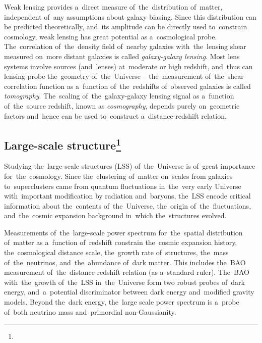 Weak lensing provides a~direct measure of~the~distribution of~matter, independent of~any assumptions about galaxy biasing. Since this distribution can be predicted theoretically, and~its amplitude can be directly used to~constrain cosmology, weak lensing has great potential as a~cosmological probe. The~correlation of~the~density field of~nearby galaxies with~the~lensing shear measured on~more distant galaxies is called \textit{galaxy-galaxy lensing}. Most lens systems involve sources (and~lenses) at~moderate or high redshift, and~thus can lensing probe the~geometry of~the~Universe -- the~measurement of~the~shear correlation function as a~function of~the~redshifts of~observed galaxies is called \textit{tomography}. The~scaling of~the~galaxy-galaxy lensing signal as a~function of~the~source redshift, known as \textit{cosmography}, depends purely on~geometric factors and~hence can be used to~construct a~distance-redshift relation.
\DIFdelbegin %
\DIFdelend \DIFaddbegin \subsection[Large-scale structure]{\DIFaddend Large-scale structure\DIFaddbegin \footnote{}\DIFaddend }
\DIFaddbegin \label{ssec:lss}
\DIFaddend Studying the~large-scale structures (LSS) of~the~Universe is of~great importance for~the~cosmology. Since the~clustering of~matter on~scales from galaxies to~superclusters came from quantum fluctuations in~the~very early Universe with~important modification by radiation and~baryons, the~LSS encode critical information about the~contents of~the~Universe, the~origin of~the~fluctuations, and~the~cosmic expansion background in~which the~structures evolved.

Measurements of~the~large-scale power spectrum for~the~spatial distribution of~matter as a~function of~redshift constrain the~cosmic expansion history, the~cosmological distance scale, the~growth rate of~structures, the~mass of~the~neutrinos, and~the~abundance of~dark matter. This includes the~BAO measurement of~the~distance-redshift relation (as a~standard ruler). The~BAO with~the~growth of~the~LSS in~the~Universe form two robust probes of~dark energy, and~a~potential discriminator between dark energy and~modified gravity models. Beyond the~dark energy, the~large scale power spectrum is a~probe of~both neutrino mass and~primordial non-Gaussianity.
